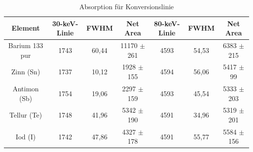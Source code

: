\documentclass[
	parskip=half,10pt,
	numbers= noenddot, %
	toc=flat, %
	oneside,
	twocolumn,
	]{scrartcl}
\begin{document}
\begin{table}[h]
\begin{tabular}{ccccccc}
 Element & 30-keV-Linie & FWHM & Net Area & 80-keV-Linie & FWHM & Net Area \\
 \hline
 Barium 133 pur & 1743 & 60,44 & 11170 $\pm$ 261 & 4593 & 54,53 & 6383 $\pm$ 215 \\
 Zinn (Sn)      & 1737 & 10,12 &  1928 $\pm$ 155 & 4594 & 56,06 & 5417 $\pm$  99 \\
 Antimon (Sb)   & 1754 & 19,06 &  2297 $\pm$ 159 & 4593 & 45,54 & 5333 $\pm$ 203 \\
 Tellur (Te)    & 1748 & 41,96 &  5342 $\pm$ 190 & 4591 & 34,96 & 5319 $\pm$ 201 \\
 Iod (I)        & 1742 & 47,86 &  4327 $\pm$ 178 & 4591 & 55,77 & 5584 $\pm$ 156 \\
\end{tabular}
\caption{Absorption für Konversionslinie}
\label{tab:konversion}
\end{table}
\end{document}
